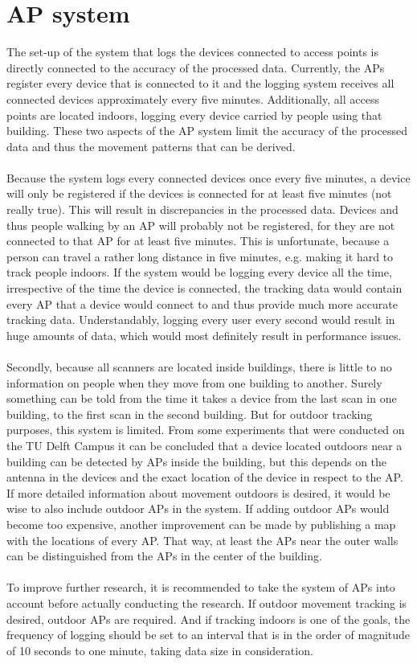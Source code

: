 \section{AP system}
The set-up of the system that logs the devices connected to access points is directly connected to the accuracy of the processed data. Currently, the APs register every device that is connected to it and the logging system receives all connected devices approximately every five minutes. Additionally, all access points are located indoors, logging every device carried by people using that building. These two aspects of the AP system limit the accuracy of the processed data and thus the movement patterns that can be derived. \\\\
Because the system logs every connected devices once every five minutes, a device will only be registered if the devices is connected for at least five minutes (not really true). This will result in discrepancies in the processed data. Devices and thus people walking by an AP will probably not be registered, for they are not connected to that AP for at least five minutes. This is unfortunate, because a person can travel a rather long distance in five minutes, e.g. making it hard to track people indoors. If the system would be logging every device all the time, irrespective of the time the device is connected, the tracking data would contain every AP that a device would connect to and thus provide much more accurate tracking data. Understandably, logging every user every second would result in huge amounts of data, which would most definitely result in performance issues.\\\\
Secondly, because all scanners are located inside buildings, there is little to no information on people when they move from one building to another. Surely something can be told from the time it takes a device from the last scan in one building, to the first scan in the second building. But for outdoor tracking purposes, this system is limited. From some experiments that were conducted on the TU Delft Campus it can be concluded that a device located outdoors near a building can be detected by APs inside the building, but this depends on the antenna in the devices and the exact location of the device in respect to the AP. If more detailed information about movement outdoors is desired, it would be wise to also include outdoor APs in the system. If adding outdoor APs would become too expensive, another improvement can be made by publishing a map with the locations of every AP. That way, at least the APs near the outer walls can be distinguished from the APs in the center of the building.\\\\
To improve further research, it is recommended to take the system of APs into account before actually conducting the research. If outdoor movement tracking is desired, outdoor APs are required. And if tracking indoors is one of the goals, the frequency of logging should be set to an interval that is in the order of magnitude of 10 seconds to one minute, taking data size in consideration.

